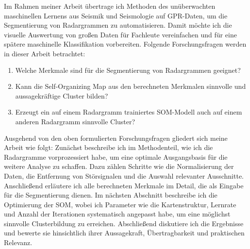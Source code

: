 \noindent Im Rahmen meiner Arbeit übertrage ich Methoden des unüberwachten maschinellen Lernens aus Seismik und Seismologie auf GPR-Daten, um die Segmentierung von Radargrammen zu automatisieren. Damit möchte ich die visuelle Auswertung von großen Daten für Fachleute vereinfachen und für eine spätere maschinelle Klassifikation vorbereiten. Folgende Forschungsfragen werden in dieser Arbeit betrachtet: 

\begin{enumerate}
    \item Welche Merkmale sind für die Segmentierung von Radargrammen geeignet?
    \item Kann die Self-Organizing Map aus den berechneten Merkmalen sinnvolle und aussagekräftige Cluster bilden?
    \item Erzeugt ein auf einem Radargramm trainiertes SOM-Modell auch auf einem anderen Radargramm sinnvolle Cluster?
\end{enumerate}
Ausgehend von den oben formulierten Forschungsfragen gliedert sich meine Arbeit wie folgt: Zunächst beschreibe ich im Methodenteil, wie ich die Radargramme vorprozessiert habe, um eine optimale Ausgangsbasis für die weitere Analyse zu schaffen. Dazu zählen Schritte wie die Normalisierung der Daten, die Entfernung von Störsignalen und die Auswahl relevanter Ausschnitte. Anschließend erläutere ich alle berechneten Merkmale im Detail, die als Eingabe für die Segmentierung dienen. Im nächsten Abschnitt beschreibe ich die Optimierung der SOM, wobei ich Parameter wie die Kartenstruktur, Lernrate und Anzahl der Iterationen systematisch angepasst habe, um eine möglichst sinnvolle Clusterbildung zu erreichen. Abschließend diskutiere ich die Ergebnisse und bewerte sie hinsichtlich ihrer Aussagekraft, Übertragbarkeit und praktischen Relevanz. \\
